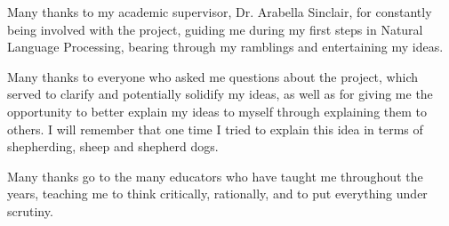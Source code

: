\documentclass[bsc]{abdnthesis}
\begin{document}
\begin{acknowledgements}
    Many thanks to my academic supervisor, Dr. Arabella Sinclair, for constantly being involved with the project, guiding me during my first steps in Natural Language Processing, bearing through my ramblings and entertaining my ideas.

    Many thanks to everyone who asked me questions about the project, which served to clarify and potentially solidify my ideas, as well as for giving me the opportunity to better explain my ideas to myself through explaining them to others. I will remember that one time I tried to explain this idea in terms of shepherding, sheep and shepherd dogs. 
    
    Many thanks go to the many educators who have taught me throughout the years, teaching me to think critically, rationally, and to put everything under scrutiny.
\end{acknowledgements}



\tableofcontents

\clearpage
\printnoidxglossary[type=\acronymtype,sort=standard, nonumberlist, title=Abbreviations]
\clearpage



% 






% 

\appendix
% 





\end{document}
